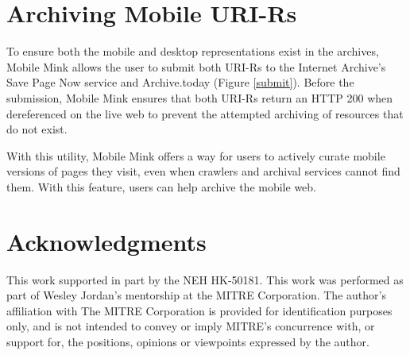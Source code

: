 \documentclass{sig-alternate}
\begin{document}
\section{Archiving Mobile URI-Rs}
\label{flow}
To ensure both the mobile and desktop representations exist in the archives, Mobile Mink allows the user to submit both URI-Rs to the Internet Archive's Save Page Now service and Archive.today (Figure \ref{submit}). Before the submission, Mobile Mink ensures that both URI-Rs return an HTTP 200 when dereferenced on the live web to prevent the attempted archiving of resources that do not exist. 

With this utility, Mobile Mink offers a way for users to actively curate mobile versions of pages they visit, even when crawlers and archival services cannot find them. With this feature, users can help archive the mobile web.

\section{Acknowledgments}
This work supported in part by the NEH HK-50181. This work was performed as part of Wesley Jordan's mentorship at the MITRE Corporation. The author's affiliation with The MITRE Corporation is provided for identification purposes only, and is not intended to convey or imply MITRE's concurrence with, or support for, the positions, opinions or viewpoints expressed by the author. 



  
\end{document}
